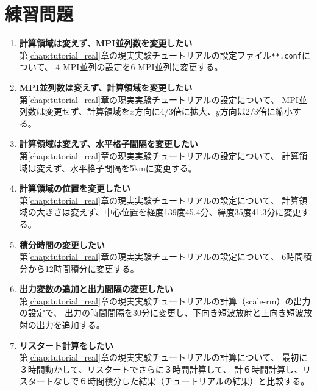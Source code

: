\section*{練習問題}

\begin{enumerate}
\item {\bf 計算領域は変えず、MPI並列数を変更したい}\\
第\ref{chap:tutorial_real}章の現実実験チュートリアルの設定ファイル\verb|**.conf|について、
4-MPI並列の設定を6-MPI並列に変更する。

\item {\bf MPI並列数は変えず、計算領域を変更したい}\\
第\ref{chap:tutorial_real}章の現実実験チュートリアルの設定について、
MPI並列数は変更せず、計算領域を$x$方向に4/3倍に拡大、$y$方向は2/3倍に縮小する。

\item {\bf 計算領域は変えず、水平格子間隔を変更したい}\\
第\ref{chap:tutorial_real}章の現実実験チュートリアルの設定について、
計算領域は変えず、水平格子間隔を5kmに変更する。

\item {\bf 計算領域の位置を変更したい}\\
第\ref{chap:tutorial_real}章の現実実験チュートリアルの設定について、
計算領域の大きさは変えず、中心位置を経度139度45.4分、緯度35度41.3分に変更する。

\item {\bf 積分時間の変更したい}\\
第\ref{chap:tutorial_real}章の現実実験チュートリアルの設定について、
6時間積分から12時間積分に変更する。

\item {\bf 出力変数の追加と出力間隔の変更したい}\\
第\ref{chap:tutorial_real}章の現実実験チュートリアルの計算（scale-rm）の出力の設定で、
出力の時間間隔を30分に変更し、下向き短波放射と上向き短波放射の出力を追加する。

\item {\bf リスタート計算をしたい}\\
第\ref{chap:tutorial_real}章の現実実験チュートリアルの計算について、
最初に３時間動かして、リスタートでさらに３時間計算して、
計６時間計算し、リスタートなしで６時間積分した結果（チュートリアルの結果）と比較する。

\end{enumerate}

